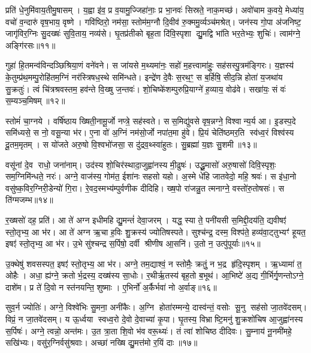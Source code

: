 प्रति॑ धे॒नुमि॑वाय॒तीमु॒षासम्। य॒ह्वा इ॑व॒ प्र व॒यामु॒ज्जिहा॑नाः॒ प्र भा॒नवः॑ सिस्रते॒ नाक॒मच्छ॑। अवो॑चाम क॒वये॒ मेध्या॑य॒ वचो॑ व॒न्दारु॑ वृष॒भाय॒ वृष्णे। गवि॑ष्ठिरो॒ नम॑सा॒ स्तोम॑म॒ग्नौ दि॒वीव॑ रु॒क्ममु॒र्व्यञ्च॑मश्रेत्। जन॑स्य गो॒पा अ॑जनिष्ट॒ जागृ॑विर॒ग्निः सु॒दख्षः॑ सुवि॒ताय॒ नव्य॑से। घृ॒तप्र॑तीको बृह॒ता दि॑वि॒स्पृशा द्यु॒मद्वि भा॑ति भर॒तेभ्यः॒ शुचिः॑। त्वाम॑ग्ने॒ अङ्गि॑रसः॥११॥

गुहा॑ हि॒तमन्व॑विन्दञ्छिश्रिया॒णं वने॑वने। स जा॑यसे म॒थ्यमा॑नः॒ सहो॑ म॒हत्त्वामा॑हुः॒ सह॑सस्पु॒त्रम॑ङ्गिरः। य॒ज्ञस्य॑ के॒तुम्प्र॑थ॒मम्पु॒रोहि॑तम॒ग्निं नर॑स्त्रिषध॒स्थे समि॑न्धते। इन्द्रे॑ण दे॒वैः स॒रथ॒ꣳ॒ स ब॒र्\mbox{}हिषि॒ सीद॒न्नि होता॑ य॒जथा॑य सु॒क्रतुः॑। त्वं चि॑त्रश्रवस्तम॒ हव॑न्ते वि॒ख्षु ज॒न्तवः॑। शो॒चिष्के॑शम्पुरुप्रि॒याग्ने॑ ह॒व्याय॒ वोढ॑वे। सखा॑यः॒ सं वः॑ स॒म्यञ्च॒मिषम्॥१२॥

स्तोमं॑ चा॒ग्नये। वर्\mbox{}षि॑ष्ठाय ख्षिती॒नामू॒र्जो नप्त्रे॒ सह॑स्वते। सस॒मिद्यु॑वसे वृष॒न्नग्ने॒ विश्वान्य॒र्य आ। इ॒डस्प॒दे समि॑ध्यसे॒ स नो॒ वसू॒न्या भ॑र। ए॒ना वो॑ अ॒ग्निं नम॑सो॒र्जो नपा॑त॒मा हु॑वे। प्रि॒यं चेति॑ष्ठमर॒ति स्व॑ध्व॒रं विश्व॑स्य दू॒तम॒मृतम्। स यो॑जते अरु॒षो वि॒श्वभो॑जसा॒ स दु॑द्रव॒थ्स्वा॑हुतः। सु॒ब्रह्मा॑ य॒ज्ञः सु॒शमी॥१३॥

वसू॑नां दे॒व राधो॒ जना॑नाम्। उद॑स्य शो॒चिर॑स्थादा॒जुह्वा॑नस्य मी॒ढुषः॑। उद्धू॒मासो॑ अरु॒षासो॑ दिवि॒स्पृशः॒ सम॒ग्निमि॑न्धते॒ नरः॑। अग्ने॒ वाज॑स्य॒ गोम॑त॒ ईशा॑नः सहसो यहो। अ॒स्मे धे॑हि जातवेदो॒ महि॒ श्रवः॑। स इ॑धा॒नो वसु॑ष्क॒विर॒ग्निरी॒डेन्यो॑ गि॒रा। रे॒वद॒स्मभ्य॑म्पुर्वणीक दीदिहि। ख्ष॒पो रा॑जन्नु॒त त्मनाग्ने॒ वस्तो॑रु॒तोषसः॑। स ति॑ग्मजम्भ॥१४॥

र॒ख्षसो॑ दह॒ प्रति॑। आ ते॑ अग्न इधीमहि द्यु॒मन्तं॑ देवा॒जरम्। यद्ध॒ स्या ते॒ पनी॑यसी स॒मिद्दी॒दय॑ति॒ द्यवीषꣵ॑ स्तो॒तृभ्य॒ आ भ॑र। आ ते॑ अग्न ऋ॒चा ह॒विः शु॒क्रस्य॑ ज्योतिषस्पते। सुश्च॑न्द्र॒ दस्म॒ विश्प॑ते॒ हव्य॑वा॒ट्तुभ्यꣳ॑ हूयत॒ इषꣵ॑ स्तो॒तृभ्य॒ आ भ॑र। उ॒भे सु॑श्चन्द्र स॒र्पिषो॒ दर्वी श्रीणीष आ॒सनि॑। उ॒तो न॒ उत्पु॑पूर्याः॥१५॥

उ॒क्थेषु॑ शवसस्पत॒ इषꣵ॑ स्तो॒तृभ्य॒ आ भ॑र। अग्ने॒ तम॒द्याश्वं॒ न स्तोमैः॒ क्रतुं॒ न भ॒द्र हृ॑दि॒स्पृशम्। ऋ॒ध्यामा॑ त॒ ओहैः। अधा॒ ह्य॑ग्ने॒ क्रतोर्भ॒द्रस्य॒ दख्ष॑स्य सा॒धोः। र॒थीर्\mbox{}ऋ॒तस्य॑ बृह॒तो ब॒भूथ॑। आ॒भिष्टे॑ अ॒द्य गी॒र्भिर्गृ॒णन्तोऽग्ने॒ दाशे॑म। प्र ते॑ दि॒वो न स्त॑नयन्ति॒ शुष्माः। ए॒भिर्नो॑ अ॒र्कैर्भवा॑ नो अ॒र्वाङ्॥१६॥

सुव॒र्न ज्योतिः॑। अग्ने॒ विश्वे॑भिः सु॒मना॒ अनी॑कैः। अ॒ग्नि होता॑रम्मन्ये॒ दास्व॑न्तं॒ वसोः सू॒नु सह॑सो जा॒तवे॑दसम्। विप्रं॒ न जा॒तवे॑दसम्। य ऊ॒र्ध्वया स्वध्व॒रो दे॒वो दे॒वाच्या॑ कृ॒पा। घृ॒तस्य॒ विभ्राष्टि॒मनु॑ शु॒क्रशो॑चिष आ॒जुह्वा॑नस्य स॒र्पिषः॑। अग्ने॒ त्वन्नो॒ अन्त॑मः। उ॒त त्रा॒ता शि॒वो भ॑व वरू॒थ्यः॑। तं त्वा॑ शोचिष्ठ दीदिवः। सु॒म्नाय॑ नू॒नमी॑महे॒ सखि॑भ्यः। वसु॑र॒ग्निर्वसु॑श्रवाः। अच्छा॑ नख्षि द्यु॒मत्त॑मो र॒यिं दाः॥१७॥


